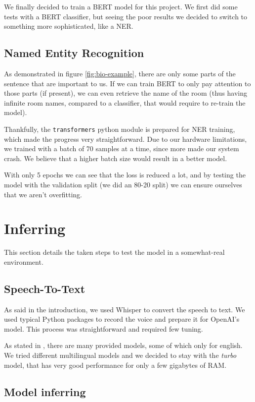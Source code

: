 \documentclass{article}
\begin{document}
We finally decided to train a BERT model for this project. We first did some tests with a BERT classifier, but seeing the poor results we decided to switch to something more sophisticated, like a NER.

\subsection{Named Entity Recognition}

As demonstrated in figure \ref{fig:bio-example}, there are only some parts of the sentence that are important to us. If we can train BERT to only pay attention to those parts (if present), we can even retrieve the name of the room (thus having infinite room names, compared to a classifier, that would require to re-train the model).

Thankfully, the \verb|transformers| python module is prepared for NER training, which made the progress very straightforward. Due to our hardware limitations, we trained with a batch of 70 samples at a time, since more made our system crash. We believe that a higher batch size would result in a better model.

With only 5 epochs we can see that the loss is reduced a lot, and by testing the model with the validation split (we did an 80-20 split) we can ensure ourselves that we aren't overfitting.

\section{Inferring}

This section details the taken steps to test the model in a somewhat-real environment.

\subsection{Speech-To-Text}

As said in the introduction, we used Whisper to convert the speech to text. We used typical Python packages to record the voice and prepare it for OpenAI's model. This process was straightforward and required few tuning.

As stated in \cite{whisper}, there are many provided models, some of which only for english. We tried different multilingual models and we decided to stay with the \textit{turbo} model, that has very good performance for only a few gigabytes of RAM.

\subsection{Model inferring}
\end{document}
